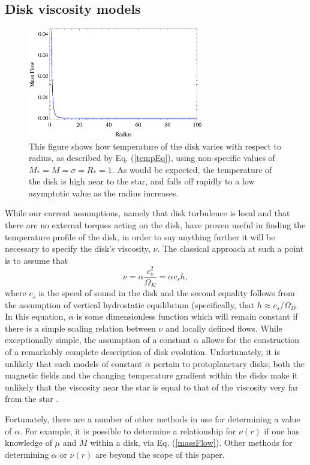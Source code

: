 \documentclass[aps,pra,twocolumn]{revtex4-1}
\begin{document}
\subsection{\label{section2.3} Disk viscosity models}
\begin{figure} [t!]
	\includegraphics[width=3in]{temperature.eps}
	\caption{This figure shows how temperature of the disk varies with respect to radius, as described by Eq. (\ref{tempEq}), using non-specific values of $M_* = \dot{M} = \sigma = R_* = 1$.  As would be expected, the temperature of the disk is high near to the star, and falls off rapidly to a low asymptotic value as the radius increases. \label{tempFig}}
\end{figure}
While our current assumptions, namely that disk turbulence is local and that there are no external torques acting on the disk, have proven useful in finding the temperature profile of the disk, in order to say anything further it will be necessary to specify the disk's viscosity, $\nu$.  The classical approach at such a point is to assume that
\begin{equation}
\nu = \alpha \frac{c_s^2}{\Omega_K} = \alpha c_s h , \label{nuRelation}
\end{equation}
where $c_s$ is the speed of sound in the disk and the second equality follows from the assumption of vertical hydrostatic equilibrium (specifically, that $h \approx c_s/\Omega_D$.  In this equation, $\alpha$ is some dimensionless function which will remain constant if there is a simple scaling relation between $\nu$ and locally defined flows.  While exceptionally simple, the assumption of a constant $\alpha$ allows for the construction of a remarkably complete description of disk evolution.  Unfortunately, it is unlikely that such models of constant $\alpha$ pertain to protoplanetary disks; both the magnetic fields and the changing temperature gradient within the disks make it unlikely that the viscosity near the star is equal to that of the viscosity very far from the star \cite{armitage2011}.

Fortunately, there are a number of other methods in use for determining a value of $\alpha$.  For example, it is possible to determine a relationship for $\nu(r)$ if one has knowledge of $\mu$ and $\dot{M}$ within a disk, via Eq. (\ref{massFlow}).  Other methods for determining $\alpha$ or $\nu(r)$ are beyond the scope of this paper.
\end{document}
